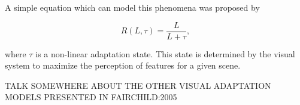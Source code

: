 A simple equation which can model this phenomena was proposed by~\cite{Naka:1966}

\begin{equation}
\label{eq:visual_adaptation}
R(L, \tau) = \frac{L}{L + \tau},
\end{equation}

where $\tau$ is a non-linear adaptation state.
This state is determined by the visual system to maximize the perception of features for a given scene.

TALK SOMEWHERE ABOUT THE OTHER VISUAL ADAPTATION MODELS PRESENTED IN FAIRCHILD:2005
